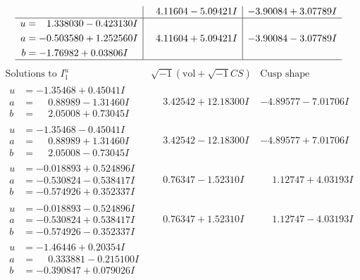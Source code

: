 \documentclass[1p]{elsarticle_modified}
\theoremstyle{definition}
\newcommand{\I}{\sqrt{-1}}
\begin{document}
$$\begin{array}{c|c|c}
 & \phantom{-}4.11604 - 5.09421 I & -3.90084 + 3.07789 I \\ \hline\begin{aligned}
u &= \phantom{-}1.338030 - 0.423130 I \\
a &= -0.503580 + 1.252560 I \\
b &= -1.76982 + 0.03806 I\end{aligned}
 & \phantom{-}4.11604 + 5.09421 I & -3.90084 - 3.07789 I\\
 \hline 
 \end{array}$$\newpage$$\begin{array}{c|c|c}  
\text{Solutions to }I^u_{1}& \I (\text{vol} + \sqrt{-1}CS) & \text{Cusp shape}\\
 \hline 
\begin{aligned}
u &= -1.35468 + 0.45041 I \\
a &= \phantom{-}0.88989 - 1.31460 I \\
b &= \phantom{-}2.05008 + 0.73045 I\end{aligned}
 & \phantom{-}3.42542 + 12.18300 I & -4.89577 - 7.01706 I \\ \hline\begin{aligned}
u &= -1.35468 - 0.45041 I \\
a &= \phantom{-}0.88989 + 1.31460 I \\
b &= \phantom{-}2.05008 - 0.73045 I\end{aligned}
 & \phantom{-}3.42542 - 12.18300 I & -4.89577 + 7.01706 I \\ \hline\begin{aligned}
u &= -0.018893 + 0.524896 I \\
a &= -0.530824 - 0.538417 I \\
b &= -0.574926 + 0.352337 I\end{aligned}
 & \phantom{-}0.76347 - 1.52310 I & \phantom{-}1.12747 + 4.03193 I \\ \hline\begin{aligned}
u &= -0.018893 - 0.524896 I \\
a &= -0.530824 + 0.538417 I \\
b &= -0.574926 - 0.352337 I\end{aligned}
 & \phantom{-}0.76347 + 1.52310 I & \phantom{-}1.12747 - 4.03193 I \\ \hline\begin{aligned}
u &= -1.46446 + 0.20354 I \\
a &= \phantom{-}0.333881 - 0.215100 I \\
b &= -0.390847 + 0.079026 I\end{aligned}

\end{array}$$
\end{document}
